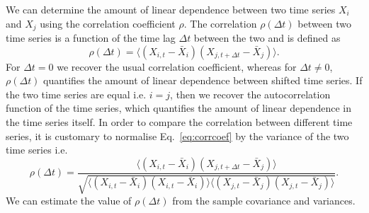 \documentclass[12pt, a4paper]{article}
\begin{document}
We can determine the amount of linear dependence between two time series $X_{i}$ and $X_{j}$ using the correlation coefficient $\rho$. The correlation $\rho(\Delta t)$ between two time series is a function of the time lag $\Delta t$ between the two and is defined as \cite{dettling14}
\begin{equation}
\rho(\Delta t) = \langle (X_{i, t}-\bar{X}_{i}) (X_{j, t+\Delta t}-\bar{X}_{j}) \rangle. \label{eq:corrcoef}
\end{equation} 
For $\Delta t = 0$ we recover the usual correlation coefficient, whereas for $\Delta t \neq 0$, $\rho(\Delta t)$ quantifies the amount of linear dependence between shifted time series. If the two time series are equal i.e. $i = j$, then we recover the autocorrelation function of the time series, which quantifies the amount of linear dependence in the time series itself. In order to compare the correlation between different time series, it is customary to normalise Eq.~\ref{eq:corrcoef} by the variance of the two time series i.e. \cite{dettling14}
\begin{equation}
\rho(\Delta t) = \frac{\langle (X_{i, t}-\bar{X}_{i}) (X_{j, t+\Delta t}-\bar{X}_{j}) \rangle}{\sqrt{\langle (X_{i, t}-\bar{X}_{i}) (X_{i, t}-\bar{X}_{i}) \rangle \langle (X_{j, t}-\bar{X}_{j}) (X_{j, t}-\bar{X}_{j}) \rangle}}.
\end{equation} 
We can estimate the value of $\rho(\Delta t)$ from the sample covariance and variances.
\end{document}
